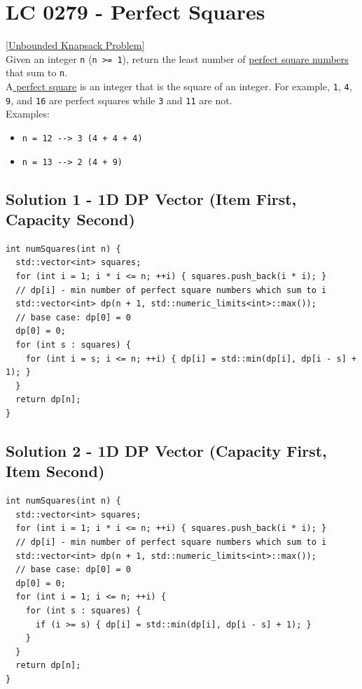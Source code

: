 \section{LC 0279 - Perfect Squares}\label{lc0279}
{\hyperref[subsubsec:unbounded_knapsack_oj_problems]{[Unbounded Knapsack Problem]}} \\

Given an integer {\colorbox{CodeBackground}{\lstinline|n|}} ({\colorbox{CodeBackground}{\lstinline|n >= 1|}}), return the least number of \ul{perfect square numbers} that sum to {\colorbox{CodeBackground}{\lstinline|n|}}.\\

A\ul{ perfect square} is an integer that is the square of an integer. For example, {\colorbox{CodeBackground}{\lstinline|1|}}, {\colorbox{CodeBackground}{\lstinline|4|}}, {\colorbox{CodeBackground}{\lstinline|9|}}, and {\colorbox{CodeBackground}{\lstinline|16|}} are perfect squares while {\colorbox{CodeBackground}{\lstinline|3|}} and {\colorbox{CodeBackground}{\lstinline|11|}} are not.\\

Examples:
\begin{itemize}
\item {\colorbox{CodeBackground}{\lstinline|n = 12 --> 3 (4 + 4 + 4)|}}
\item {\colorbox{CodeBackground}{\lstinline|n = 13 --> 2 (4 + 9)|}}
\end{itemize}

\subsection*{Solution 1 - 1D DP Vector (Item First, Capacity Second)}
\begin{lstlisting}
int numSquares(int n) {
  std::vector<int> squares;
  for (int i = 1; i * i <= n; ++i) { squares.push_back(i * i); }
  // dp[i] - min number of perfect square numbers which sum to i
  std::vector<int> dp(n + 1, std::numeric_limits<int>::max());
  // base case: dp[0] = 0
  dp[0] = 0;
  for (int s : squares) {
    for (int i = s; i <= n; ++i) { dp[i] = std::min(dp[i], dp[i - s] + 1); }
  }
  return dp[n];
}
\end{lstlisting}

\subsection*{Solution 2 - 1D DP Vector (Capacity First, Item Second)}
\begin{lstlisting}
int numSquares(int n) {
  std::vector<int> squares;
  for (int i = 1; i * i <= n; ++i) { squares.push_back(i * i); }
  // dp[i] - min number of perfect square numbers which sum to i
  std::vector<int> dp(n + 1, std::numeric_limits<int>::max());
  // base case: dp[0] = 0
  dp[0] = 0;
  for (int i = 1; i <= n; ++i) {
    for (int s : squares) {
      if (i >= s) { dp[i] = std::min(dp[i], dp[i - s] + 1); }
    }
  }
  return dp[n];
}
\end{lstlisting}

